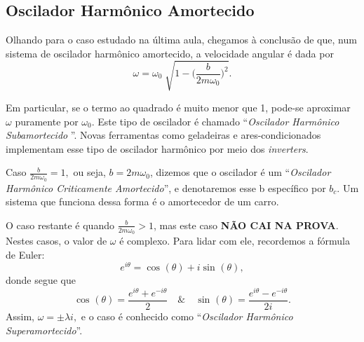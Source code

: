\documentclass{article}
\begin{document}
\subsection{Oscilador Harmônico Amortecido}
Olhando para o caso estudado na última aula, chegamos à conclusão de que, num sistema 
de oscilador harmônico amortecido, a velocidade angular é dada por 
\[
  \omega  = \omega_{0} \sqrt[]{1-\biggl(\frac{b}{2m\omega_{0}}\biggr)^{2}}.
\]

Em particular, se o termo ao quadrado é muito menor que 1, pode-se aproximar \(\omega \) puramente
por \(\omega_{0}\). Este tipo de oscilador é chamado ``\textit{Oscilador Harmônico Subamortecido} ''. 
Novas ferramentas como geladeiras e ares-condicionados implementam esse tipo de oscilador harmônico por meio 
dos \textit{inverters}.

Caso \(\frac{b}{2m\omega_{0}} = 1,\) ou seja, \(b = 2m\omega_{0}\), dizemos que o oscilador é um 
``\textit{Oscilador Harmônico Criticamente Amortecido}'', e denotaremos esse b específico por \(b_{c}.\) 
Um sistema que funciona dessa forma é o amortecedor de um carro.

O caso restante é quando \(\frac{b}{2m\omega_{0}} > 1\), mas este caso \textbf{NÃO CAI NA PROVA}. Nestes casos,
o valor de \(\omega \) é complexo. Para lidar com ele, recordemos a fórmula de Euler: 
\[
  e^{i \theta } = \cos^{}{(\theta )} + i\sin^{}{(\theta )},
\]
donde segue que 
\[
  \cos^{}{(\theta )} = \frac{e^{i\theta }+e^{-i\theta }}{2}\quad\&\quad \sin^{}{(\theta )} = \frac{e^{i\theta }-e^{-i\theta }}{2i}.
\]
Assim, \(\omega = \pm \lambda i,\) e o caso é conhecido como ``\textit{Oscilador Harmônico Superamortecido}''.
\end{document}
